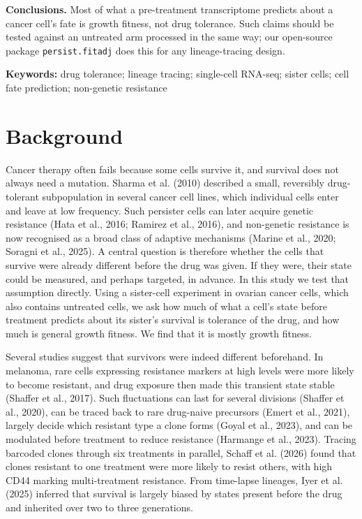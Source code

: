 \documentclass[11pt,a4paper]{article}
\begin{document}
\textbf{Conclusions.} Most of what a pre-treatment transcriptome predicts about a cancer cell's fate is growth fitness, not drug tolerance. Such claims should be tested against an untreated arm processed in the same way; our open-source package \texttt{persist.fitadj} does this for any lineage-tracing design.

\textbf{Keywords:} drug tolerance; lineage tracing; single-cell RNA-seq; sister cells; cell fate prediction; non-genetic resistance

\section*{Background}

Cancer therapy often fails because some cells survive it, and survival does not always need a mutation. Sharma et al. (2010) described a small, reversibly drug-tolerant subpopulation in several cancer cell lines, which individual cells enter and leave at low frequency. Such persister cells can later acquire genetic resistance (Hata et al., 2016; Ramirez et al., 2016), and non-genetic resistance is now recognised as a broad class of adaptive mechanisms (Marine et al., 2020; Soragni et al., 2025). A central question is therefore whether the cells that survive were already different before the drug was given. If they were, their state could be measured, and perhaps targeted, in advance. In this study we test that assumption directly. Using a sister-cell experiment in ovarian cancer cells, which also contains untreated cells, we ask how much of what a cell's state before treatment predicts about its sister's survival is tolerance of the drug, and how much is general growth fitness. We find that it is mostly growth fitness.

Several studies suggest that survivors were indeed different beforehand. In melanoma, rare cells expressing resistance markers at high levels were more likely to become resistant, and drug exposure then made this transient state stable (Shaffer et al., 2017). Such fluctuations can last for several divisions (Shaffer et al., 2020), can be traced back to rare drug-naive precursors (Emert et al., 2021), largely decide which resistant type a clone forms (Goyal et al., 2023), and can be modulated before treatment to reduce resistance (Harmange et al., 2023). Tracing barcoded clones through six treatments in parallel, Schaff et al. (2026) found that clones resistant to one treatment were more likely to resist others, with high CD44 marking multi-treatment resistance. From time-lapse lineages, Iyer et al. (2025) inferred that survival is largely biased by states present before the drug and inherited over two to three generations.
\end{document}
